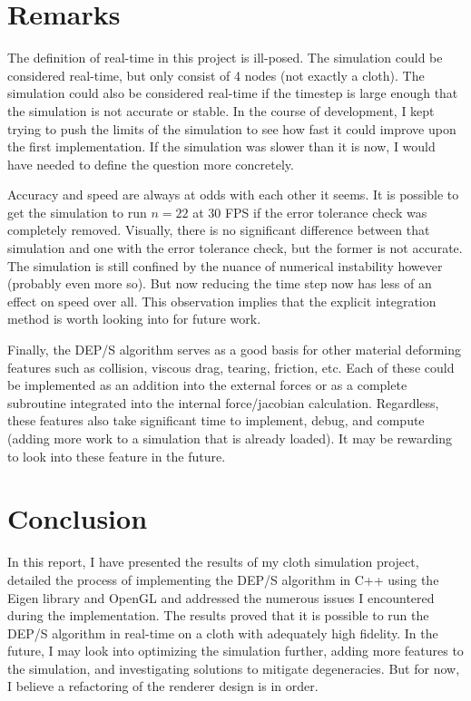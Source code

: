 \documentclass[letterpaper, 10 pt, conference]{ieeeconf}  %
\begin{document}
\section{Remarks}
        The definition of real-time in this project is ill-posed. The simulation could be considered real-time, but only consist of 4 nodes (not exactly a cloth). The simulation could also be considered real-time if the timestep is large enough that the simulation is not accurate or stable. In the course of development, I kept trying to push the limits of the simulation to see how fast it could improve upon the first implementation. If the simulation was slower than it is now, I would have needed to define the question more concretely. 

        Accuracy and speed are always at odds with each other it seems. It is possible to get the simulation to run $n=22$ at 30 FPS if the error tolerance check was completely removed. Visually, there is no significant difference between that simulation and one with the error tolerance check, but the former is not accurate. The simulation is still confined by the nuance of numerical instability however (probably even more so). But now reducing the time step now has less of an effect on speed over all. This observation implies that the explicit integration method is worth looking into for future work.

        Finally, the DEP/S algorithm serves as a good basis for other material deforming features such as collision, viscous drag, tearing, friction, etc. Each of these could be implemented as an addition into the external forces or as a complete subroutine integrated into the internal force/jacobian calculation. Regardless, these features also take significant time to implement, debug, and compute (adding more work to a simulation that is already loaded). It may be rewarding to look into these feature in the future.


\section{Conclusion}

        In this report, I have presented the results of my cloth simulation project, detailed the process of implementing the DEP/S algorithm in C++ using the Eigen library and OpenGL and addressed the numerous issues I encountered during the implementation. The results proved that it is possible to run the DEP/S algorithm in real-time on a cloth with adequately high fidelity. In the future, I may look into optimizing the simulation further, adding more features to the simulation, and investigating solutions to mitigate degeneracies. But for now, I believe a refactoring of the renderer design is in order.  
\end{document}
